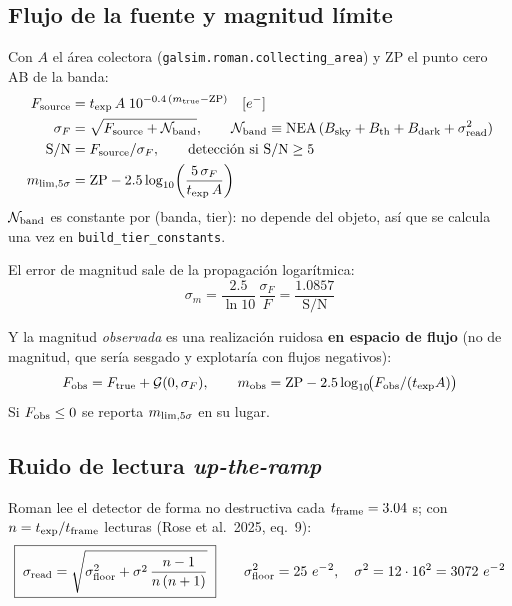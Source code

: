\documentclass[11pt,a4paper]{article}
\newcommand{\code}[1]{\texttt{\small #1}}
\newcommand{\eminus}{e^{-}}
\begin{document}
\subsection{Flujo de la fuente y magnitud límite}
Con $A$ el área colectora (\code{galsim.roman.collecting\_area}) y $\mathrm{ZP}$ el punto cero AB de
la banda:
\begin{align}
F_{\rm source} &= t_{\rm exp}\, A \; 10^{-0.4\,(m_{\rm true} - \mathrm{ZP})} \quad [\eminus] \\
\sigma_F &= \sqrt{F_{\rm source} + \mathcal{N}_{\rm band}}, \qquad
\mathcal{N}_{\rm band} \equiv \mathrm{NEA}\,(B_{\rm sky}+B_{\rm th}+B_{\rm dark}+\sigma_{\rm read}^2) \\
\mathrm{S/N} &= F_{\rm source} / \sigma_F, \qquad \text{detección si } \mathrm{S/N}\ge 5 \\
m_{\rm lim,5\sigma} &= \mathrm{ZP} - 2.5\log_{10}\!\left(\frac{5\,\sigma_F}{t_{\rm exp}\,A}\right)
\label{eq:mlim}
\end{align}
$\mathcal{N}_{\rm band}$ es constante por (banda, tier): no depende del objeto, así que se calcula
una vez en \code{build\_tier\_constants}.

El error de magnitud sale de la propagación logarítmica:
\begin{equation}
\sigma_m = \frac{2.5}{\ln 10}\,\frac{\sigma_F}{F} = \frac{1.0857}{\mathrm{S/N}}
\end{equation}

Y la magnitud \emph{observada} es una realización ruidosa \textbf{en espacio de flujo} (no de
magnitud, que sería sesgado y explotaría con flujos negativos):
\begin{equation}
F_{\rm obs} = F_{\rm true} + \mathcal{G}(0,\sigma_F), \qquad
m_{\rm obs} = \mathrm{ZP} - 2.5\log_{10}\!\bigl(F_{\rm obs}/(t_{\rm exp}A)\bigr)
\end{equation}
Si $F_{\rm obs}\le 0$ se reporta $m_{\rm lim,5\sigma}$ en su lugar.

\subsection{Ruido de lectura \emph{up-the-ramp}}
Roman lee el detector de forma no destructiva cada $t_{\rm frame}=3.04$ s; con $n = t_{\rm
exp}/t_{\rm frame}$ lecturas (Rose et al.\ 2025, eq.\ 9):
\begin{equation}
\boxed{\;\sigma_{\rm read} = \sqrt{\sigma_{\rm floor}^2 + \sigma^2\,\frac{n-1}{n\,(n+1)}}\;}
\qquad \sigma_{\rm floor}^2 = 25\ \eminus{}^2,\quad \sigma^2 = 12\cdot 16^2 = 3072\ \eminus{}^2
\label{eq:read}
\end{equation}
\end{document}
